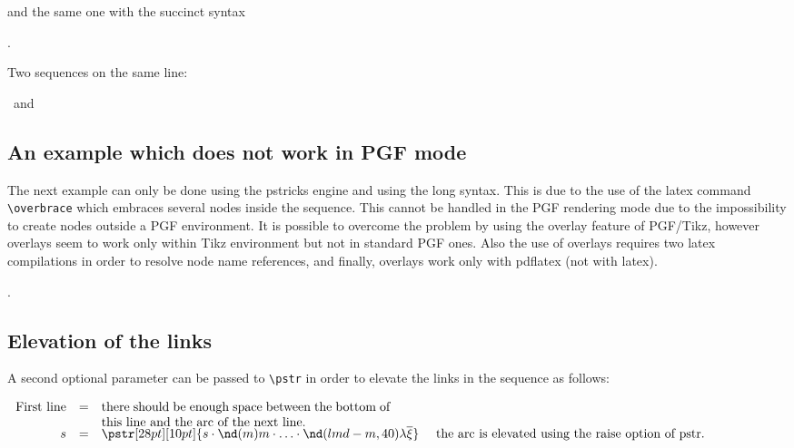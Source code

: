 and the same one with the succinct syntax
\begin{codeexample}[width=7cm]
.
\end{codeexample}

Two sequences on the same line:
\begin{codeexample}[width=15cm]
 \ and
 \ 
\end{codeexample}

\subsection{An example which does not work in PGF mode}
The next example can only be done using the pstricks engine and using the long syntax. This is due to the use of the
latex command \verb|\overbrace| which embraces several nodes inside the sequence.
This cannot be handled in the PGF rendering mode due to the impossibility to create nodes outside a PGF environment.
It is possible to overcome the problem by using the overlay feature of PGF/Tikz, however overlays seem to work only
within Tikz environment but not in standard PGF ones. Also the use of overlays requires two latex compilations in order to resolve node name references,
and finally, overlays work only with pdflatex (not with latex).
\begin{codeexample}[width=7cm]
.
\end{codeexample}

\subsection{Elevation of the links}
A second optional parameter can be passed to \verb|\pstr| in order to elevate the links in the sequence as follows:

\begin{codeexample}[width=5cm]
$\begin{array}{rclrcl}
\mbox{First line} &=& \parbox[t]{8cm}{there should be enough space between the
                        bottom of this line and the arc of the next line.} \\
                s &=& \pstr[28pt][10pt]{ s \cdot \nd(m) m \cdot \ldots \cdot
                       \nd(lmd-m,40) {\lambda\overline{\xi}} }
    \quad \mbox{ the arc is elevated using the raise option of pstr.}
\end{array}$
\end{codeexample}

